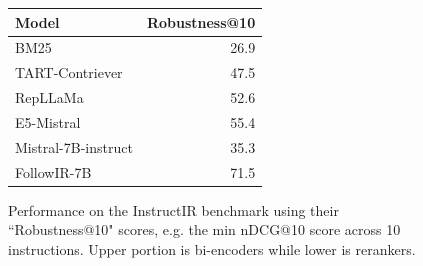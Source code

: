 
\begin{figure}
    \vspace{-10pt}
    \centering
    \setlength\tabcolsep{5 pt} %
    \begin{tabular}{lr}
    \toprule
    Model & Robustness@10 \\
    \midrule
    BM25 & 26.9 \\
    TART-Contriever & 47.5 \\
    RepLLaMa & 52.6 \\
    E5-Mistral & 55.4 \\
    \midrule
    Mistral-7B-instruct & 35.3 \\
    FollowIR-7B & 71.5 \\
    \bottomrule
    \end{tabular}
    \caption{
        Performance on the InstructIR benchmark using their ``Robustness@10" scores, e.g. the min nDCG@10 score across 10 instructions. Upper portion is bi-encoders while lower is rerankers.
        \label{tab:instructir}
    }
    \label{fig:example}
    \vspace{-1em}
\end{figure}